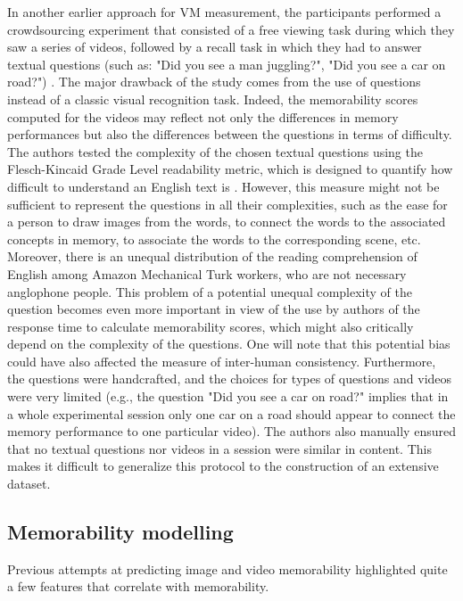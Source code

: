 \documentclass[sigconf]{acmart}
\begin{document}
In another earlier approach for VM measurement, the participants performed a crowdsourcing experiment that consisted of a free viewing task during which they saw a series of videos, followed by a recall task in which they had to answer textual questions (such as: "Did you see a man juggling?", "Did you see a car on road?") \cite{shekhar_2017_show}.
The major drawback of the study comes from the use of questions instead of a classic visual recognition task.
Indeed, the memorability scores computed for the videos may reflect not only the differences in memory performances but also the differences between the questions in terms of difficulty.
The authors tested the complexity of the chosen textual questions using the Flesch-Kincaid Grade Level readability metric, which is designed to quantify how difficult to understand an English text is \cite{kincaid_1975_derivation}.
However, this measure might not be sufficient to represent the questions in all their complexities, such as the ease for a person to draw images from the words, to connect the words to the associated concepts in memory, to associate the words to the corresponding scene, etc.
Moreover, there is an unequal distribution of the reading comprehension of English among Amazon Mechanical Turk workers, who are not necessary anglophone people.
This problem of a potential unequal complexity of the question becomes even more important in view of the use by authors of the response time to calculate memorability scores, which might also critically depend on the complexity of the questions.
One will note that this potential bias could have also affected the measure of inter-human consistency.
Furthermore, the questions were handcrafted, and the choices for types of questions and videos were very limited (e.g., the question "Did you see a car on road?" implies that in a whole experimental session only one car on a road should appear to connect the memory performance to one particular video).
The authors also manually ensured that no textual questions nor videos in a session were similar in content.
This makes it difficult to generalize this protocol to the construction of an extensive dataset.

\subsection{Memorability modelling}
Previous attempts at predicting image and video memorability highlighted quite a few features that correlate with memorability.
\end{document}
